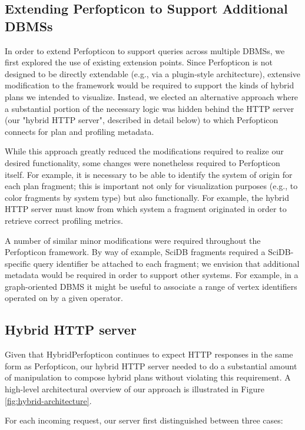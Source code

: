 \documentclass{chi2009}
\newcommand{\eg}{{e.g.}}
\begin{document}
\subsection{Extending Perfopticon to Support Additional DBMSs}

In order to extend Perfopticon to support queries across multiple DBMSs, we first explored the use of existing extension points.  Since Perfopticon is not designed to be directly extendable (\eg, via a plugin-style architecture), extensive modification to the framework would be required to support the kinds of hybrid plans we intended to visualize.  Instead, we elected an alternative approach where a substantial portion of the necessary logic was hidden behind the HTTP server (our "hybrid HTTP server", described in detail below) to which Perfopticon connects for plan and profiling metadata.

While this approach greatly reduced the modifications required to realize our desired functionality, some changes were nonetheless required to Perfopticon itself.  For example, it is necessary to be able to identify the system of origin for each plan fragment; this is important not only for visualization purposes (e.g., to color fragments by system type) but also functionally.  For example, the hybrid HTTP server must know from which system a fragment originated in order to retrieve correct profiling metrics.

A number of similar minor modifications were required throughout the Perfopticon framework.  By way of example, SciDB fragments required a SciDB-specific query identifier be attached to each fragment; we envision that additional metadata would be required in order to support other systems.  For example, in a graph-oriented DBMS it might be useful to associate a range of vertex identifiers operated on by a given operator.

\subsection{Hybrid HTTP server}

Given that HybridPerfopticon continues to expect HTTP responses in the same form as Perfopticon, our hybrid HTTP server needed to do a substantial amount of manipulation to compose hybrid plans without violating this requirement.  A high-level architectural overview of our approach is illustrated in Figure \ref{fig:hybrid-architecture}.

For each incoming request, our server first distinguished between three cases:
\end{document}
